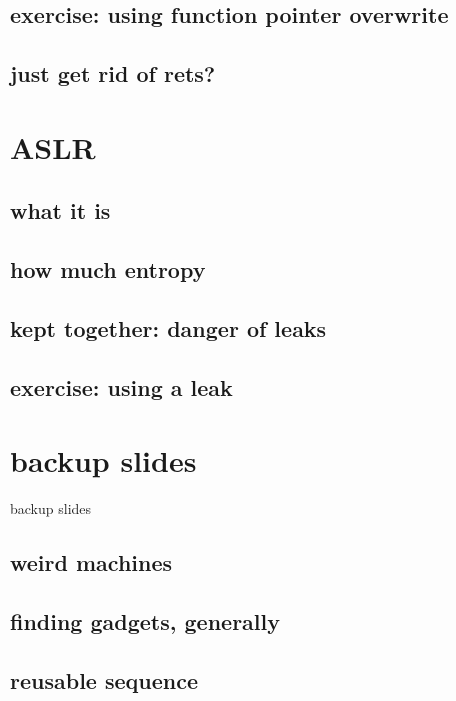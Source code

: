 \subsection{exercise: using function pointer overwrite}


\subsection{just get rid of rets?}


\section{ASLR}
\subsection{what it is}


\subsection{how much entropy}


\subsection{kept together: danger of leaks}



\subsection{exercise: using a leak}



\section{backup slides}
\begin{frame}{backup slides}
\end{frame}






\subsection{weird machines}


\subsection{finding gadgets, generally}



\subsection{reusable sequence}



